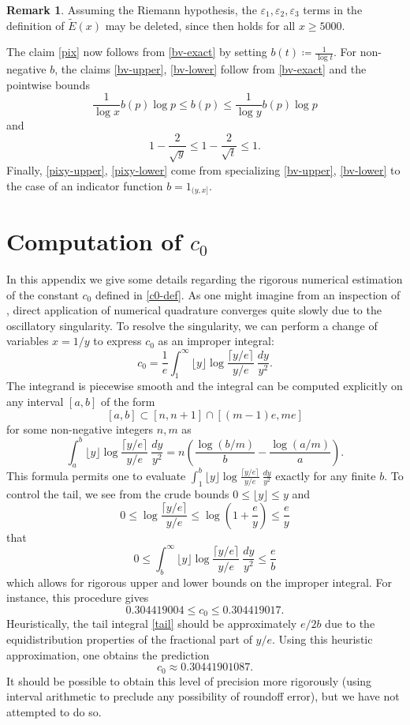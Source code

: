 \documentclass[12pt,a4paper,reqno]{amsart}
\numberwithin{equation}{section}
\theoremstyle{plain}
\theoremstyle{definition}
\newtheorem{remark}[theorem]{Remark}
\newcommand\eps{\varepsilon}
\begin{document}
\begin{remark} Assuming the Riemann hypothesis, the $\eps_1, \eps_2, \eps_3$ terms in the definition of $\tilde E(x)$ may be deleted, since \cite[(7.3)]{buthe} then holds for all $x \geq 5000$.  
\end{remark}

The claim \eqref{pix} now follows from \eqref{bv-exact} by setting $b(t) \coloneqq \frac{1}{\log t}$.  For non-negative $b$, the claims \eqref{bv-upper}, \eqref{bv-lower} follow from \eqref{bv-exact} and the pointwise bounds
$$ \frac{1}{\log x} b(p) \log p \leq b(p) \leq \frac{1}{\log y} b(p) \log p$$
and
$$ 1-\frac{2}{\sqrt{y}} \leq 1-\frac{2}{\sqrt{t}} \leq 1.$$
Finally, \eqref{pixy-upper}, \eqref{pixy-lower} come from specializing \eqref{bv-upper}, \eqref{bv-lower} to the case of an indicator function $b = 1_{(y,x]}$.



\section{Computation of \texorpdfstring{$c_0$}{c\_0}}\label{c0-app}

In this appendix we give some details regarding the rigorous numerical estimation of the constant $c_0$ defined in \eqref{c0-def}.  As one might imagine from an inspection of , direct application of numerical quadrature converges quite slowly due to the oscillatory singularity.  To resolve the singularity, we can perform a change of variables $x=1/y$ to express $c_0$ as an improper integral:
\begin{equation}\label{c0-alt}
   c_0 = \frac{1}{e} \int_1^\infty \lfloor y \rfloor \log \frac{\lceil y/e \rceil}{y/e}\ \frac{dy}{y^2}.
\end{equation}
The integrand is piecewise smooth and the integral can be computed explicitly on any interval $[a,b]$ of the form
$$ [a,b] \subset [n, n+1] \cap [(m-1)e, me]$$
for some non-negative integers $n,m$ as
$$ \int_a^b \lfloor y \rfloor \log \frac{\lceil y/e \rceil}{y/e}\ \frac{dy}{y^2} = n \left(\frac{\log(b/m)}{b} - \frac{\log(a/m)}{a}\right).$$
This formula permits one to evaluate $\int_1^b \lfloor y \rfloor \log \frac{\lceil y/e \rceil}{y/e}\ \frac{dy}{y^2}$ exactly for any finite $b$.  To control the tail, we see from the crude bounds $0 \leq \lfloor y \rfloor \leq y$ and
$$ 0 \leq \log \frac{\lceil y/e \rceil}{y/e} \leq \log 
\left(1 + \frac{e}{y}\right) \leq \frac{e}{y}
$$
that
\begin{equation}\label{tail}
   0 \leq \int_b^\infty \lfloor y \rfloor \log \frac{\lceil y/e \rceil}{y/e}\ \frac{dy}{y^2} \leq \frac{e}{b}
\end{equation}
which allows for rigorous upper and lower bounds on the improper integral.  For instance, this procedure gives
$$ 0.304419004 \leq c_0 \leq 0.304419017.$$
Heuristically, the tail integral \eqref{tail} should be approximately $e/2b$ due to the equidistribution properties of the fractional part of $y/e$.  Using this heuristic approximation, one obtains the prediction
$$ c_0 \approx 0.30441901087.$$
It should be possible to obtain this level of precision more rigorously (using interval arithmetic to preclude any possibility of roundoff error), but we have not attempted to do so.
\end{document}
